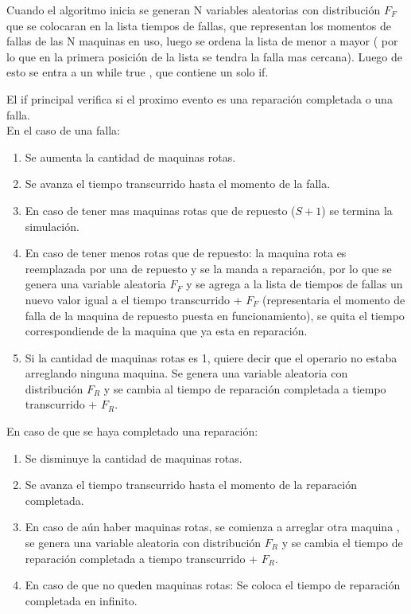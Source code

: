 \documentclass[12pt]{article}
\begin{document}
Cuando el algoritmo inicia se generan N variables aleatorias  con distribución $F_F$ que se colocaran en la lista tiempos de fallas, que representan los momentos de fallas de las N maquinas en uso, luego se ordena la lista de menor a mayor ( por lo que en la primera posición de la lista se tendra la falla mas cercana). Luego de esto se entra a un while true , que contiene un solo if.

El if principal verifica  si el proximo evento es una reparación completada o una falla.\\

En el caso de una falla:
\begin{enumerate}
    \item Se aumenta la cantidad de maquinas rotas.
    \item Se avanza el tiempo transcurrido hasta el momento de la falla.
    \item En caso de tener mas maquinas rotas que de repuesto ($S +1$) se termina la simulación.
    \item En caso de tener menos rotas que de repuesto:
        la maquina rota es reemplazada por una de repuesto y se la manda a reparación, por lo que se genera una variable aleatoria $F_F$ y se agrega  a la lista de tiempos de fallas un nuevo valor igual a el tiempo transcurrido + $F_F$ (representaria el momento de falla de  la maquina de repuesto puesta en funcionamiento), se quita el tiempo correspondiende de la maquina que ya esta en reparación.
    \item Si la cantidad de maquinas rotas es 1, quiere decir que el operario no estaba arreglando ninguna maquina. Se genera una variable aleatoria con distribución $F_R$ y se cambia al tiempo de reparación completada a tiempo transcurrido + $F_R$.
\end{enumerate}

En caso de que se haya completado una  reparación:

\begin{enumerate}
    \item Se disminuye la cantidad de maquinas rotas.
    \item Se avanza el tiempo transcurrido hasta el momento de la reparación completada.
    \item En caso de aún haber maquinas rotas, se comienza a arreglar otra maquina , se genera una variable aleatoria con distribución $F_R$ y se cambia el tiempo de reparación completada a  tiempo transcurrido + $F_R$.
     \item En caso de que no queden maquinas rotas:
        Se coloca el  tiempo de reparación completada en infinito.
\end{enumerate}
\end{document}
